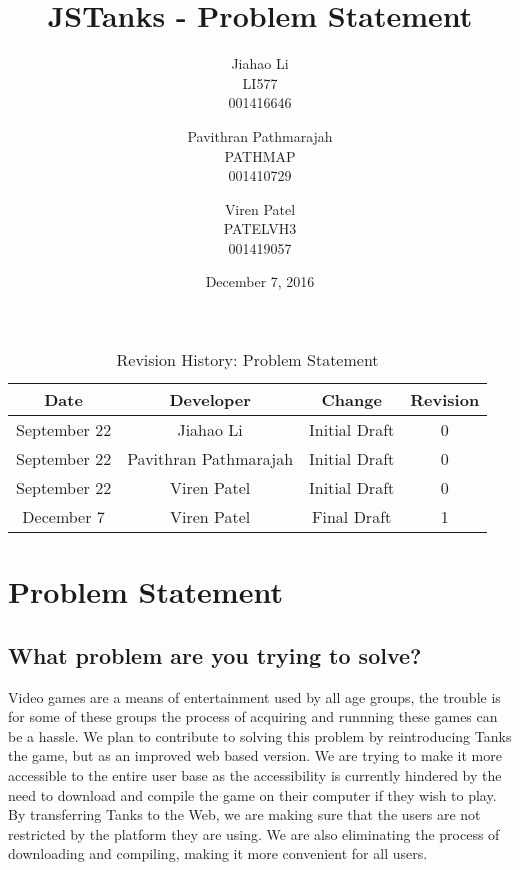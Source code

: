 \documentclass{article}
\begin{document}
\newpage
\title{JSTanks - Problem Statement}
\date{December 7, 2016}
\author{Jiahao Li\\LI577\\001416646\and Pavithran Pathmarajah\\PATHMAP\\
001410729 \and Viren Patel\\PATELVH3\\001419057}

\maketitle

\newpage
{}



\begin{table}[h!]
  \centering
  \caption{Revision History: Problem Statement}
  \label{tab:table1}
  \begin{tabular}{cccc}
	\toprule
	Date &  Developer & Change & Revision\\
	\midrule
	September 22&Jiahao Li &Initial Draft &0\\
	September 22&Pavithran Pathmarajah &Initial Draft &0\\
	September 22&Viren Patel  &Initial Draft &0\\
	December 7&Viren Patel &Final Draft&1\\
	\bottomrule
  \end{tabular}
\end{table}

\newpage

\section*{Problem Statement}

\subsection{What problem are you trying to solve?}
Video games are a means of entertainment used by all age groups, the trouble is for some of these groups the process of acquiring and runnning these games can be a hassle. We plan to contribute to solving this problem by reintroducing Tanks the game, but as an improved web based version. We are trying to make it more accessible to the entire user base as the accessibility is currently hindered by the need to download and compile the game on their computer if they wish to play. By transferring Tanks to the Web, we are making sure that the users are not restricted by the platform they are using. We are also eliminating the process of downloading and compiling, making it more convenient for all users. 
\end{document}
